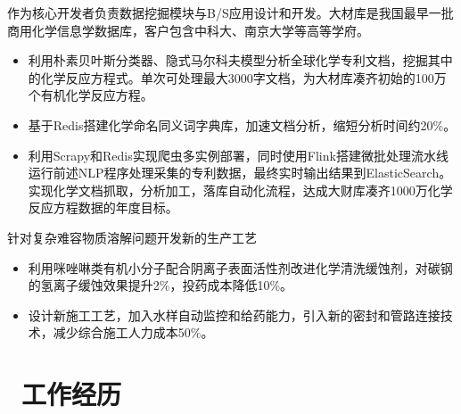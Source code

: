 \documentclass{resume}
\begin{document}
\begin{onehalfspacing}
作为核心开发者负责数据挖掘模块与B/S应用设计和开发。大材库是我国最早一批商用化学信息学数据库，客户包含中科大、南京大学等高等学府。
\begin{itemize}
  \item 利用朴素贝叶斯分类器、隐式马尔科夫模型分析全球化学专利文档，挖掘其中的化学反应方程式。单次可处理最大3000字文档，为大材库凑齐初始的100万个有机化学反应方程。
  \item 基于Redis搭建化学命名同义词字典库，加速文档分析，缩短分析时间约20\%。
  \item 利用Scrapy和Redis实现爬虫多实例部署，同时使用Flink搭建微批处理流水线运行前述NLP程序处理采集的专利数据，最终实时输出结果到ElasticSearch。实现化学文档抓取，分析加工，落库自动化流程，达成大财库凑齐1000万化学反应方程数据的年度目标。
\end{itemize}
\end{onehalfspacing}

\begin{onehalfspacing}
针对复杂难容物质溶解问题开发新的生产工艺
\begin{itemize}
  \item 利用咪唑啉类有机小分子配合阴离子表面活性剂改进化学清洗缓蚀剂，对碳钢的氢离子缓蚀效果提升2\%，投药成本降低10\%。
  \item 设计新施工工艺，加入水样自动监控和给药能力，引入新的密封和管路连接技术，减少综合施工人力成本50\%。
\end{itemize}
\end{onehalfspacing}

\section{\faUsers\ 工作经历}



\end{document}
